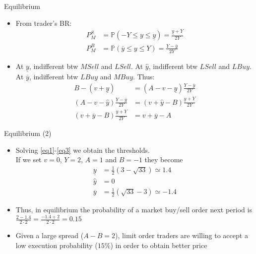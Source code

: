 \documentclass[english,10pt
,aspectratio=169
]{beamer}
\begin{document}
\begin{frame}{Equilibrium}
	\begin{itemize}
		\item From trader's BR:
		\begin{align*}
		P^S_M 	&=\mathbb{P}(-Y\le y \le \underline{y})=\frac{\underline{y}+Y}{2Y} \\
		P^B_M 	&=\mathbb{P}(\overline{y} \le y \le Y)=\frac{Y-\overline{y}}{2Y}
		\end{align*}
		\pause
		\item At $\underline{y}$, indifferent btw $MSell$ and $LSell$. At $\hat{y}$, indifferent btw $LSell$ and $LBuy$. At $\overline{y}$, indifferent btw $LBuy$ and $MBuy$. Thus:
		\begin{align}
		B-(v+\underline{y}) 					& = (A-v-\underline{y})\frac{Y-\overline{y}}{2Y} \label{eq1}\\
		(A-v-\hat{y}) \frac{Y-\overline{y}}{2Y} 			& = (v+\hat{y}-B)\frac{\underline{y}+Y}{2Y} \label{eq2}\\
		(v+\overline{y}-B) \frac{\underline{y}+Y}{2Y}  	& = v+\overline{y}-A \label{eq3}
		\end{align}
	\end{itemize}
\end{frame}


\begin{frame}{Equilibrium (2)}
	\begin{itemize}
		\item Solving \eqref{eq1}-\eqref{eq3} we obtain the thresholds. 
		\\
		If we set $v=0$, $Y=2$, $A=1$ and $B=-1$ they become
		\begin{align*}
		\underline{y} 	& = \frac{1}{2}(3-\sqrt{33}) \simeq 1.4 \\
		\hat{y} 	& = 0 \\
		\overline{y} 		& = \frac{1}{2}(\sqrt{33}-3) \simeq -1.4 
		\end{align*}
		\item Thus, in equilibrium the probability of a market buy/sell order next period is $\frac{2-1.4}{2\cdot 2}=\frac{-1.4+2}{2 \cdot 2}=0.15$
		\item Given a large spread ($A-B=2$), limit order traders are willing to accept a low execution probability ($15\%$) in order to obtain better price
	\end{itemize}
\end{frame}
\end{document}
